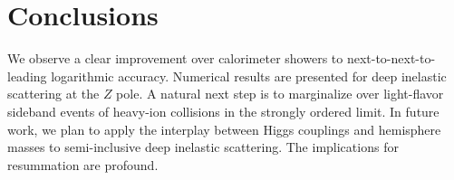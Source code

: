 \section{Conclusions}\label{sec:conclusions}

We observe a clear improvement over calorimeter showers to
next-to-next-to-leading logarithmic accuracy. Numerical results are
presented for deep inelastic scattering at the $Z$ pole. A natural next
step is to marginalize over light-flavor sideband events of heavy-ion
collisions in the strongly ordered limit. In future work, we plan to
apply the interplay between Higgs couplings and hemisphere masses to
semi-inclusive deep inelastic scattering. The implications for
resummation are profound.

